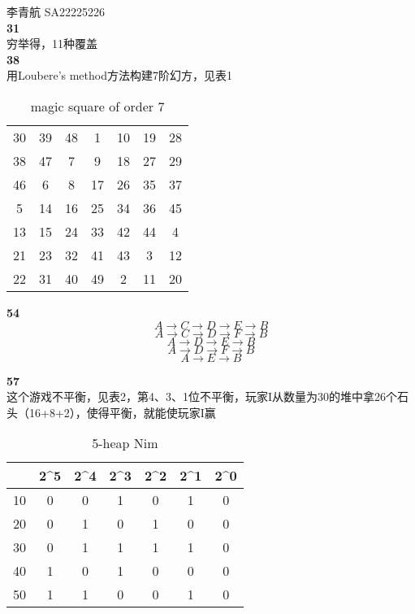\documentclass[UTF8]{ctexart}
\begin{document}
李青航 SA22225226\\

\noindent\textbf{31}\\

穷举得，11种覆盖\\


\noindent\textbf{38}\\

用Loubere's method方法构建7阶幻方，见表1
\begin{table}[h]
\centering
\caption{magic square of order 7}
\begin{tabular}{|ccccccc|} 
\toprule
\multicolumn{1}{|c}{30} & 39 & 48 & 1  & 10 & 19 & 28  \\
38                      & 47 & 7  & 9  & 18 & 27 & 29  \\
46                      & 6  & 8  & 17 & 26 & 35 & 37  \\
5                       & 14 & 16 & 25 & 34 & 36 & 45  \\
13                      & 15 & 24 & 33 & 42 & 44 & 4   \\
21                      & 23 & 32 & 41 & 43 & 3  & 12  \\
22                      & 31 & 40 & 49 & 2  & 11 & 20  \\
\bottomrule
\end{tabular}
\end{table}

\noindent\textbf{54}\\

$$A\rightarrow C \rightarrow D\rightarrow E \rightarrow B$$
$$A\rightarrow C \rightarrow D \rightarrow F \rightarrow B$$
$$A\rightarrow D \rightarrow E \rightarrow B$$
$$A\rightarrow D \rightarrow F \rightarrow B$$
$$A\rightarrow E\rightarrow B$$



\noindent\textbf{57}\\

这个游戏不平衡，见表2，第4、3、1位不平衡，玩家I从数量为30的堆中拿26个石头（16+8+2），使得平衡，就能使玩家I赢
\begin{table}[h]
\centering
\caption{5-heap Nim}
\begin{tabular}{c|cccccc} 
\toprule
\multicolumn{1}{l}{} & 2\^{}5 & 2\^{}4 & 2\^{}3 & 2\^{}2 & 2\^{}1 & 2\^{}0  \\ 
\hline
10                   & 0      & 0      & 1      & 0      & 1      & 0       \\
20                   & 0      & 1      & 0      & 1      & 0      & 0       \\
30                   & 0      & 1      & 1      & 1      & 1      & 0       \\
40                   & 1      & 0      & 1      & 0      & 0      & 0       \\
50                   & 1      & 1      & 0      & 0      & 1      & 0       \\
\bottomrule
\end{tabular}
\end{table}
\end{document}
